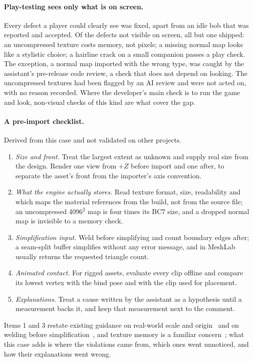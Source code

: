 \paragraph{Play-testing sees only what is on screen.} Every defect a player could
clearly see was fixed, apart from an idle bob that was reported and accepted.
Of the defects not visible on screen, all but one shipped: an uncompressed
texture costs memory, not pixels; a missing normal map looks like a stylistic
choice; a hairline crack on a small companion passes a play check. The exception,
a normal map imported with the wrong type, was caught by the assistant's
pre-release code review, a check that does not depend on looking. The
uncompressed textures had been flagged by an AI review and were not acted on,
with no reason recorded. Where the developer's main check is to run the game and
look, non-visual checks of this kind are what cover the gap.

\paragraph{A pre-import checklist.} Derived from this case and not validated on
other projects.
\begin{enumerate}
\item \emph{Size and front.} Treat the largest extent as unknown and supply real
  size from the design. Render one view from $+Z$ before import and one after, to
  separate the asset's front from the importer's axis convention.
\item \emph{What the engine actually stores.} Read texture format, size,
  readability and which maps the material references from the build, not from the
  source file; an uncompressed 4096$^2$ map is four times its BC7 size, and a
  dropped normal map is invisible to a memory check.
\item \emph{Simplification input.} Weld before simplifying and count boundary
  edges after; a seam-split buffer simplifies without any error message, and in
  MeshLab usually returns the requested triangle count.
\item \emph{Animated contact.} For rigged assets, evaluate every clip offline and
  compare its lowest vertex with the bind pose and with the clip used for
  placement.
\item \emph{Explanations.} Treat a cause written by the assistant as a hypothesis
  until a measurement backs it, and keep that measurement next to the comment.
\end{enumerate}
Items 1 and 3 restate existing guidance on real-world scale and
origin~\cite{khronos3dc2025guidelines} and on welding before
simplification~\cite{meshopt}, and texture memory is a familiar
concern~\cite{unity_mobileart}; what this case adds is where the violations came
from, which ones went unnoticed, and how their explanations went wrong.
